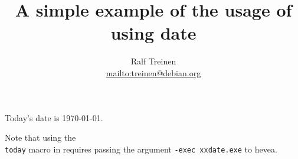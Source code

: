 \documentclass[11pt]{article}
\title{A simple example of the usage of \hevea{} using date}
\author{Ralf Treinen\\\url{mailto:treinen@debian.org}}
\begin{document}
\maketitle

Today's date is \today.

Note that using the \texttt{\\today} macro in \hevea{} requires
passing the argument \texttt{-exec xxdate.exe} to hevea.
\end{document}
